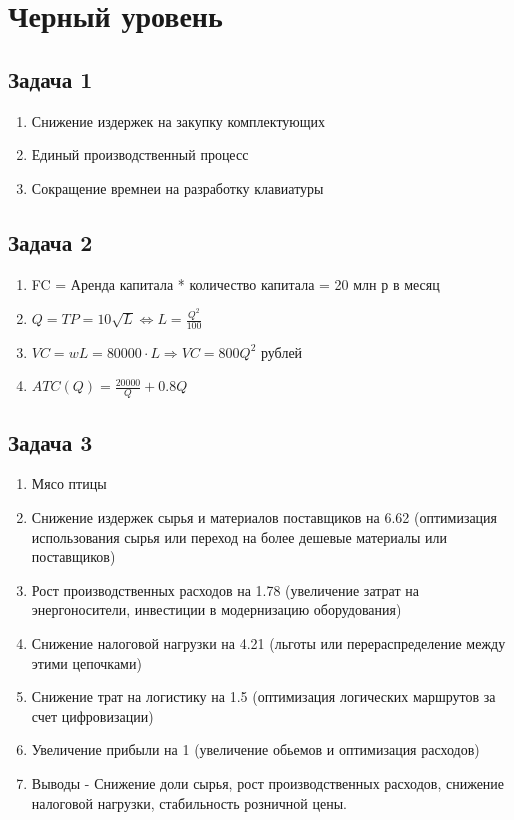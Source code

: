 \documentclass[a4paper,12pt]{article}
\begin{document}
\section{Черный уровень}

\subsection{Задача 1}
\begin{enumerate}
    \item Снижение издержек на закупку комплектующих
    \item Единый производственный процесс
    \item Сокращение времнеи на разработку клавиатуры
\end{enumerate}

\subsection{Задача 2}
\begin{enumerate}
    \item FC = Аренда капитала * количество капитала = 20 млн р в месяц
    \item $Q=TP = 10\sqrt{L} \Leftrightarrow L = \frac{Q^2}{100}$
    \item $VC = wL = 80000\cdot L \Rightarrow VC=800Q^2$ рублей
    \item $ATC(Q)=\frac{20000}{Q}+0.8Q$
\end{enumerate}

\subsection{Задача 3}
\begin{enumerate}
    \item Мясо птицы
    \item Снижение издержек сырья и материалов поставщиков на 6.62 (оптимизация использования сырья или переход на более дешевые материалы или поставщиков)
    \item Рост производственных расходов на 1.78 (увеличение затрат на энергоносители, инвестиции в модернизацию оборудования)
    \item Снижение налоговой нагрузки на 4.21 (льготы или перераспределение между этими цепочками)
    \item Снижение трат на логистику на 1.5 (оптимизация логических маршрутов за счет цифровизации)
    \item Увеличение прибыли на 1 (увеличение обьемов и оптимизация расходов)
    \item Выводы - Снижение доли сырья, рост производственных расходов, снижение налоговой нагрузки, стабильность розничной цены.
\end{enumerate}
\end{document}
